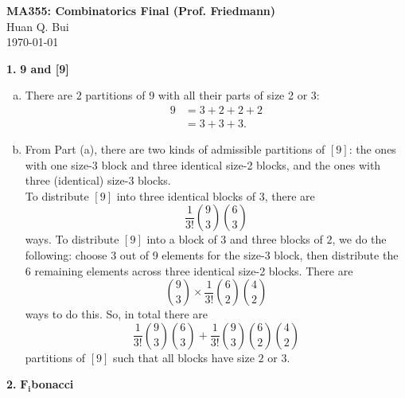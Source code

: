 \documentclass[11pt]{article}
\newcommand{\f}[2]{\frac{#1}{#2}}
\begin{document}
	\begin{framed}
\begin{center}
{\large \bf MA355: Combinatorics Final (Prof. Friedmann)}\\
{ Huan Q. Bui}\\
\today
\end{center}
\end{framed}







\noindent \textbf{1.} \textbf{9 and [9]}
\begin{enumerate}[(a)]
	\item There are $\boxed{2}$ partitions of 9 with all their parts of size 2 or 3: 
	\begin{align*}
	9 &= 3 + 2 + 2 + 2 \\
	&= 3+3+3.
	\end{align*}
	
	
	\item From Part (a), there are two kinds of admissible partitions of $[9]$: the ones with one size-3 block and three identical size-2 blocks, and the ones with three (identical) size-3 blocks. \\
	
	
	To distribute $[9]$ into three identical blocks of $3$, there are
	\begin{equation*}
	\f{1}{3!} {9\choose 3} {6\choose 3}
	\end{equation*}
	ways. To distribute $[9]$ into a block of 3 and three blocks of $2$, we do the following: choose 3 out of 9 elements for the size-3 block, then distribute the 6 remaining elements across three identical size-2 blocks. There are
	\begin{equation*}
	{9 \choose 3} \times  \f{1}{3!}{6\choose 2}{4\choose 2}
	\end{equation*}
	ways to do this. So, in total there are
	\begin{equation*}
	\boxed{\f{1}{3!} {9\choose 3} {6\choose 3} + \f{1}{3!} {9 \choose 3}{6\choose 2}{4\choose 2}}
	\end{equation*}
	partitions of $[9]$ such that all blocks have size $2$ or $3$. 
\end{enumerate}



\newpage



\noindent \textbf{2.} \textbf{$\mathbf{F_i}$bonacci}
\end{document}
